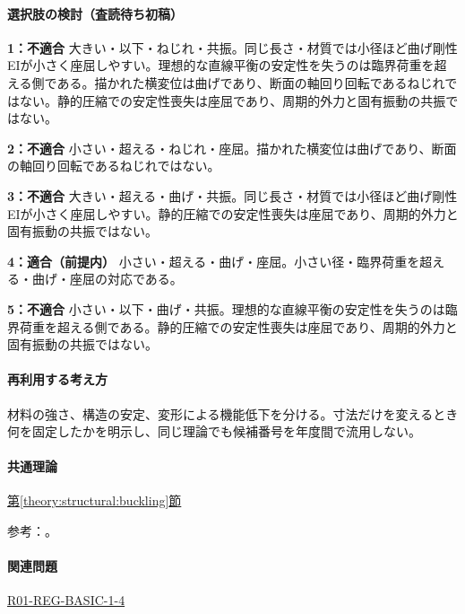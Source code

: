 \paragraph{選択肢の検討（査読待ち初稿）}\mbox{}\par

\noindent\textbf{1：不適合} 大きい・以下・ねじれ・共振。同じ長さ・材質では小径ほど曲げ剛性EIが小さく座屈しやすい。理想的な直線平衡の安定性を失うのは臨界荷重を超える側である。描かれた横変位は曲げであり、断面の軸回り回転であるねじれではない。静的圧縮での安定性喪失は座屈であり、周期的外力と固有振動の共振ではない。\par

\noindent\textbf{2：不適合} 小さい・超える・ねじれ・座屈。描かれた横変位は曲げであり、断面の軸回り回転であるねじれではない。\par

\noindent\textbf{3：不適合} 大きい・超える・曲げ・共振。同じ長さ・材質では小径ほど曲げ剛性EIが小さく座屈しやすい。静的圧縮での安定性喪失は座屈であり、周期的外力と固有振動の共振ではない。\par

\noindent\textbf{4：適合（前提内）} 小さい・超える・曲げ・座屈。小さい径・臨界荷重を超える・曲げ・座屈の対応である。\par

\noindent\textbf{5：不適合} 小さい・以下・曲げ・共振。理想的な直線平衡の安定性を失うのは臨界荷重を超える側である。静的圧縮での安定性喪失は座屈であり、周期的外力と固有振動の共振ではない。\par

\paragraph{再利用する考え方} 材料の強さ、構造の安定、変形による機能低下を分ける。寸法だけを変えるとき何を固定したかを明示し、同じ理論でも候補番号を年度間で流用しない。

\paragraph{共通理論} \hyperref[theory:structural:buckling]{第\ref*{theory:structural:buckling}節}

\par 参考：\cite{struct_mit_beam,struct_mit_buckling,struct_mlit_limit}。

\paragraph{関連問題} \hyperref[q:r01-reg-basic-1-4]{R01-REG-BASIC-1-4}

